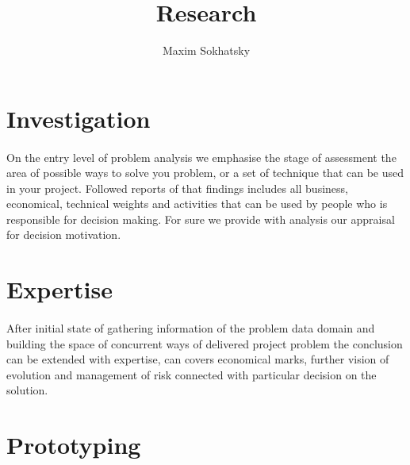\documentclass[11pt]{article}
\begin{document}

\title{Research}
\author{Maxim Sokhatsky}

\section*{Investigation}
\paragraph{}
    On the entry level of problem analysis we emphasise the stage of
    assessment the area of possible ways to solve you problem, or a
    set of technique that can be used in your project. Followed reports
    of that findings includes all business, economical, technical weights
    and activities that can be used by people who is responsible for
    decision making. For sure we provide with analysis our appraisal
    for decision motivation.
\section*{Expertise}
\paragraph{}
After initial state of gathering information of the problem data domain
    and building the space of concurrent ways of delivered project problem
    the conclusion can be extended with expertise, can covers economical
    marks, further vision of evolution and management of risk connected
    with particular decision on the solution.
\section*{Prototyping}
\end{document}
